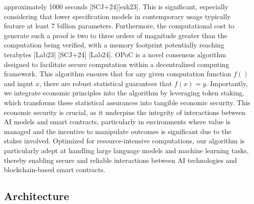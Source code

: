 \documentclass{article}
\begin{document}
approximately 1000 seconds [SCJ+24][ezk23]. This is significant, especially considering that lower
specification models in contemporary usage typically feature at least 7 billion parameters. Furthermore,
the computational cost to generate such a proof is two to three orders of magnitude greater than the
computation being verified, with a memory footprint potentially reaching terabytes [Lab23] [SCJ+24]
[Lab24]. 
OPoC is a novel consensus algorithm designed to facilitate secure computation within a decentralized computing framework. This algorithm ensures that for any given computation function \( f() \) and input \( x \), there are robust statistical guarantees that \( f(x) = y \). Importantly, we integrate economic principles into the algorithm by leveraging token staking, which transforms these statistical assurances into tangible economic security. This economic security is crucial, as it underpins the integrity of interactions between AI models and smart contracts, particularly in environments where value is managed and the incentive to manipulate outcomes is significant due to the stakes involved. Optimized for resource-intensive computations, our algorithm is particularly adept at handling large language models and machine learning tasks, thereby enabling secure and reliable interactions between AI technologies and blockchain-based smart contracts.

\subsection{Architecture}
\end{document}
